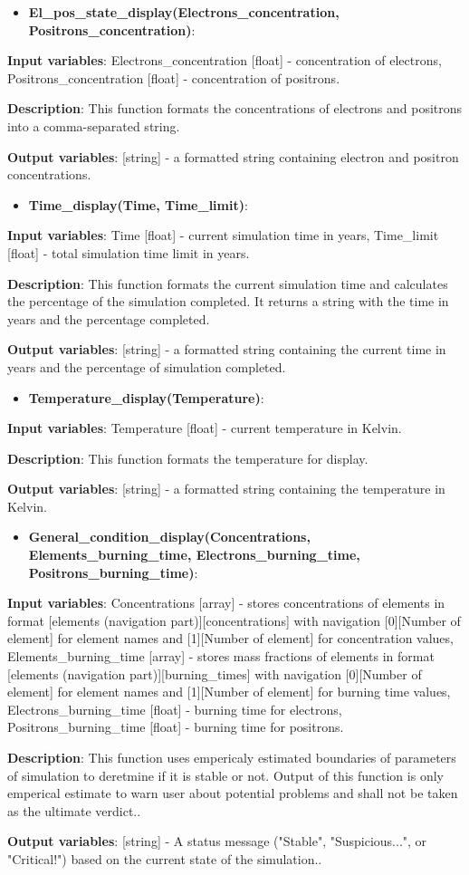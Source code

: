 \documentclass[a4paper,12pt]{article}
\newcommand{\namefunction}[4]{
  \begin{itemize}
    \item \textbf{#1}:
  \end{itemize}
  
  \textbf{Input variables}: #2.
  
  \textbf{Description}: #3.
  
  \textbf{Output variables}: #4.
}
\begin{document}
\vspace{1em}

\namefunction{El\_pos\_state\_display(Electrons\_concentration, Positrons\_concentration)}{Electrons\_concentration [float] - concentration of electrons, Positrons\_concentration [float] - concentration of positrons}{This function formats the concentrations of electrons and positrons into a comma-separated string}{[string] - a formatted string containing electron and positron concentrations}

\vspace{1em}

\namefunction{Time\_display(Time, Time\_limit)}{Time [float] - current simulation time in years, Time\_limit [float] - total simulation time limit in years}{This function formats the current simulation time and calculates the percentage of the simulation completed. It returns a string with the time in years and the percentage completed}{[string] - a formatted string containing the current time in years and the percentage of simulation completed}

\vspace{1em}

\namefunction{Temperature\_display(Temperature)}{Temperature [float] - current temperature in Kelvin}{This function formats the temperature for display}{[string] - a formatted string containing the temperature in Kelvin}

\vspace{1em}

\namefunction{General\_condition\_display(Concentrations, Elements\_burning\_time, Electrons\_burning\_time, Positrons\_burning\_time)}{Concentrations [array] - stores concentrations of elements in format [elements (navigation part)][concentrations] with navigation [0][Number of element] for element names and [1][Number of element] for concentration values, Elements\_burning\_time [array] - stores mass fractions of elements in format [elements (navigation part)][burning\_times] with navigation [0][Number of element] for element names and [1][Number of element] for burning time values, Electrons\_burning\_time [float] - burning time for electrons, Positrons\_burning\_time [float] - burning time for positrons}
{This function uses empericaly estimated boundaries of parameters of simulation to deretmine if it is stable or not. Output of this function is only emperical estimate to warn user about potential problems and shall not be taken as the ultimate verdict.}
{[string] - A status message ("Stable", "Suspicious...", or "Critical!") based on the current state of the simulation.}
\end{document}
